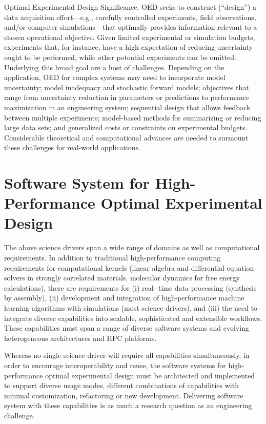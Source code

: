 \documentclass[11pt]{article}
\begin{document}
Optimal Experimental Design Significance. OED seeks to construct
(“design”) a data acquisition effort—e.g., carefully controlled
experiments, field observations, and/or computer simulations—that
optimally provides information relevant to a chosen operational
objective. Given limited experimental or simulation budgets,
experiments that, for instance, have a high expectation of reducing
uncertainty ought to be performed, while other potential experiments
can be omitted. Underlying this broad goal are a host of
challenges. Depending on the application, OED for complex systems may
need to incorporate model uncertainty; model inadequacy and stochastic
forward models; objectives that range from uncertainty reduction in
parameters or predictions to performance maximization in an
engineering system; sequential design that allows feedback between
multiple experiments; model-based methods for summarizing or reducing
large data sets; and generalized costs or constraints on experimental
budgets. Considerable theoretical and computational advances are
needed to surmount these challenges for real-world applications.


\section{Software System for High-Performance Optimal Experimental Design}

The above science drivers span a wide range of domains as well as
computational requirements. In addition to traditional
high-performance computing requirements for computational kernels
(linear algebra and differential equation solvers in strongly
correlated materials, molecular dynamics for free energy
calculations), there are requirements for (i) real- time data
processing (synthesis by assembly), (ii) development and integration
of high-performance machine learning algorithms with simulations (most
science drivers), and (iii) the need to integrate diverse capabilities
into scalable, sophisticated and extensible workflows. These
capabilities must span a range of diverse software systems and
evolving heterogeneous architectures and HPC platforms.

Whereas no single science driver will require all capabilities
simultaneously, in order to encourage interoperability and reuse, the
software systems for high-performance optimal experimental design must
be architected and implemented to support diverse usage modes,
different combinations of capabilities with minimal customization,
refactoring or new development.  Delivering software system with these
capabilities is as much a research question as an engineering
challenge.
\end{document}

